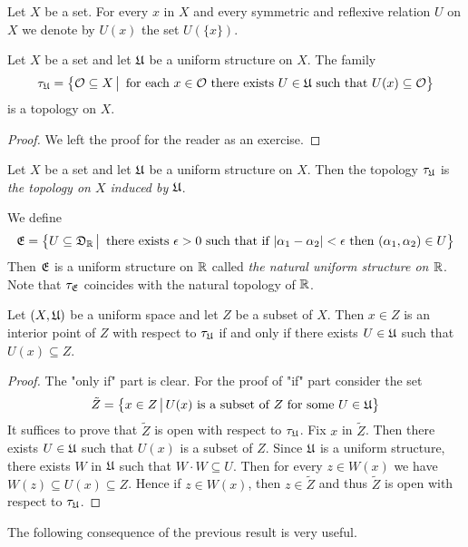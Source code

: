\begin{remark}\label{remark:notation_for_ball}
Let $X$ be a set. For every $x$ in $X$ and every symmetric and reflexive relation $U$ on $X$ we denote by $U(x)$ the set $U(\{x\})$.
\end{remark}

\begin{fact}\label{fact:topology_induced_by_uniform_structure}
Let $X$ be a set and let ${\mathfrak U}$ be a uniform structure on $X$. The family
$$\tau_{{\mathfrak U}} = \big\{{\mathcal O}\subseteq X\,\big|\,\mbox{ for each }x\in {\mathcal O}\mbox{ there exists }U\in {\mathfrak U}\mbox{ such that }U(x) \subseteq {\mathcal O}\big\}$$
is a topology on $X$.
\end{fact}
\begin{proof}
We left the proof for the reader as an exercise.
\end{proof}

\begin{definition}
Let $X$ be a set and let ${\mathfrak U}$ be a uniform structure on $X$. Then the topology $\tau_{{\mathfrak U}}$ is \textit{the topology on $X$ induced by ${\mathfrak U}$}.
\end{definition}

\begin{example}\label{example:natural_uniform_structure_on_real_line}
We define
$${\mathfrak E} = \big\{U\subseteq {\mathfrak D}_{{\mathbb R}}\,\big|\,\mbox{ there exists }\epsilon > 0\mbox{ such that if }|\alpha_1 - \alpha_2| < \epsilon\mbox{ then }(\alpha_1,\alpha_2)\in U\big\}$$
Then ${\mathfrak E}$ is a uniform structure on ${\mathbb R}$ called \textit{the natural uniform structure on ${\mathbb R}$}. Note that $\tau_{{\mathfrak E}}$ coincides with the natural topology of ${\mathbb R}$. 
\end{example}

\begin{proposition}\label{proposition:interiors_in_topology_induced_by_uniform_structure}
Let $(X,{\mathfrak U})$ be a uniform space and let $Z$ be a subset of $X$. Then $x\in Z$ is an interior point of $Z$ with respect to $\tau_{{\mathfrak U}}$ if and only if there exists $U \in {\mathfrak U}$ such that $U(x) \subseteq Z$.
\end{proposition}
\begin{proof}
The "only if" part is clear. For the proof of "if" part consider the set
$$\tilde{Z} = \big\{x\in Z\,\big|\,U(x)\mbox{ is a subset of }Z\mbox{ for some }U\in {\mathfrak U}\big\}$$ 
It suffices to prove that $\tilde{Z}$ is open with respect to $\tau_{{\mathfrak U}}$. Fix $x$ in $\tilde{Z}$. Then there exists $U \in {\mathfrak U}$ such that $U(x)$ is a subset of $Z$. Since ${\mathfrak U}$ is a uniform structure, there exists $W$ in ${\mathfrak U}$ such that $W\cdot W \subseteq U$. Then for every $z \in W(x)$ we have $W(z)\subseteq U(x)\subseteq Z$. Hence if $z \in W(x)$, then $z \in \tilde{Z}$ and thus $\tilde{Z}$ is open with respect to $\tau_{{\mathfrak U}}$.
\end{proof}
\noindent
The following consequence of the previous result is very useful.


